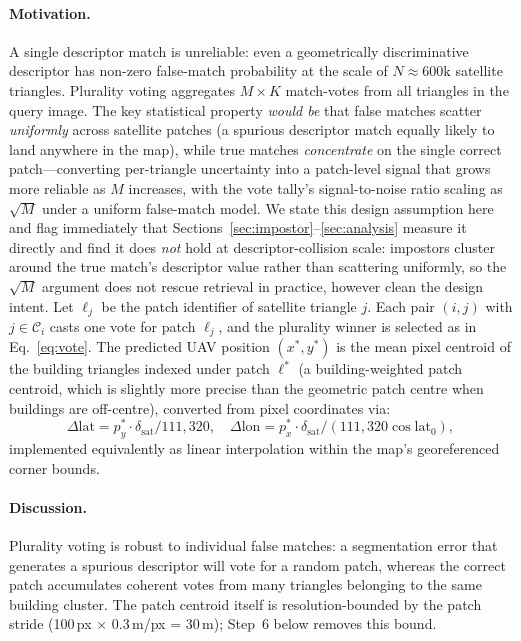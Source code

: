 \documentclass[10pt]{article}
\theoremstyle{plain}
\theoremstyle{definition}
\begin{document}
\paragraph{Motivation.}
A single descriptor match is unreliable: even a geometrically discriminative
descriptor has non-zero false-match probability at the scale of
$N \approx 600\text{k}$ satellite triangles.
Plurality voting aggregates $M \times K$ match-votes from all triangles in the
query image.
The key statistical property \emph{would be} that false matches scatter
\emph{uniformly} across satellite patches (a spurious descriptor match
equally likely to land anywhere in the map), while true matches
\emph{concentrate} on the single correct patch---converting per-triangle
uncertainty into a patch-level signal that grows more reliable as $M$
increases, with the vote tally's signal-to-noise ratio scaling as $\sqrt{M}$
under a uniform false-match model. We state this design assumption here and
flag immediately that Sections~\ref{sec:impostor}--\ref{sec:analysis}
measure it directly and find it does \emph{not} hold at descriptor-collision
scale: impostors cluster around the true match's descriptor value rather
than scattering uniformly, so the $\sqrt{M}$ argument does not rescue
retrieval in practice, however clean the design intent.
Let $\ell_j$ be the patch identifier of satellite triangle $j$.
Each pair $(i,j)$ with $j \in \mathcal{C}_i$ casts one vote for patch
$\ell_j$, and the plurality winner is selected as in Eq.~\eqref{eq:vote}.
The predicted UAV position $(x^*,y^*)$ is the mean pixel centroid of the
building triangles indexed under patch $\ell^*$ (a building-weighted patch
centroid, which is slightly more precise than the geometric patch centre when
buildings are off-centre), converted from pixel coordinates via:
\begin{equation}
\Delta\mathrm{lat} = p_y^* \cdot \delta_{\mathrm{sat}} / 111{,}320,\quad
\Delta\mathrm{lon} = p_x^* \cdot \delta_{\mathrm{sat}} /
  (111{,}320\cos\mathrm{lat}_0),
\label{eq:geoconvert}
\end{equation}
implemented equivalently as linear interpolation within the map's
georeferenced corner bounds.

\paragraph{Discussion.}
Plurality voting is robust to individual false matches: a segmentation error
that generates a spurious descriptor will vote for a random patch, whereas
the correct patch accumulates coherent votes from many triangles belonging
to the same building cluster.
The patch centroid itself is resolution-bounded by the patch stride
(100\,px $\times$ 0.3\,m/px = 30\,m); Step~6 below removes this bound.
\end{document}
